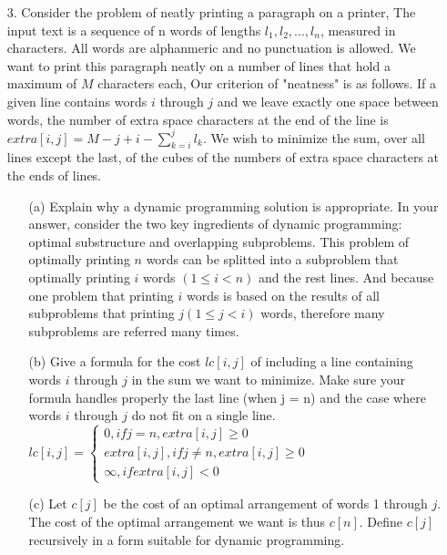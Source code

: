 \documentclass{article}       %
\begin{document}
\begin{enumerate}
\begin{enumerate}
	\end{enumerate}	
	\item[3.] Consider the problem of neatly printing a paragraph on a printer, The input text is a sequence of n words of lengths $l_1, l_2, ..., l_n$, measured in characters. All words are alphanmeric and no punctuation is allowed. We want to print this paragraph neatly on a number of lines that hold a maximum of $M$ characters each, Our criterion of "neatness" is as follows. If a given line contains words $i$ through $j$ and we leave exactly one space between words, the number of extra space characters at the end of the line is $extra[i, j] = M - j + i -\sum_{k=i}^{j}l_k$. We wish to minimize the sum, over all lines except the last, of the cubes of the numbers of extra space characters at the ends of lines.
	\begin{enumerate}
		\item[(a)] Explain why a dynamic programming solution is appropriate. In your answer, consider the two key ingredients of dynamic programming: optimal substructure and overlapping subproblems.\newline\newline
		This problem of  optimally printing $n$ words can be splitted into a subproblem that optimally printing $i$ words $(1 \leq i < n)$ and the rest lines. And because one problem that printing $i$ words is based on the results of all subproblems that printing $j(1 \leq j < i)$ words, therefore many subproblems are referred many times.\newline
		\item[(b)] Give a formula for the cost $lc[i,j]$ of including a line containing words $i$ through $j$ in the sum we want to minimize. Make sure your formula handles properly the last line (when j = n) and the case where words $i$ through $j$ do not fit on a single line.\newline\newline
		$lc[i,j] = \begin{cases} 0, if j = n, extra[i,j] \geq 0 \\  extra[i,j], if j \neq n, extra[i,j] \geq 0 \\ \infty, if extra[i,j] < 0\end{cases}$\newline
		\item[(c)] Let $c[j]$ be the cost of an optimal arrangement of words 1 through $j$. The cost of the optimal arrangement we want is thus $c[n]$. Define $c[j]$ recursively in a form suitable for dynamic programming.\newline\newline

\end{enumerate}
\end{enumerate}
\end{document}
